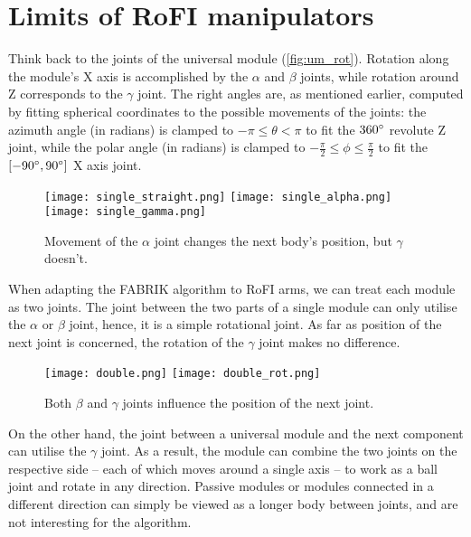 \section{Limits of RoFI manipulators}

Think back to the joints of the universal module (\ref{fig:um_rot}). Rotation along the module's X axis is accomplished by the $\alpha$ and $\beta$ joints, while rotation around Z corresponds to the $\gamma$ joint. The right angles are, as mentioned earlier, computed by fitting spherical coordinates to the possible movements of the joints: the azimuth angle (in radians) is clamped to $-\pi \le \theta < \pi$ to fit the $360\degree$ revolute Z joint, while the polar angle (in radians) is clamped to $-\frac{\pi}{2} \le \phi \le \frac{\pi}{2}$ to fit the $\left[-90\degree, 90\degree\right]$ X axis joint.

\begin{wrapfigure}{r}{0.5\textwidth}
  \centering
  \begin{minipage}{0.5\textwidth}
    \texttt{[image: single\_straight.png]}
    \texttt{[image: single\_alpha.png]}
    \texttt{[image: single\_gamma.png]}
  \end{minipage}
  \caption{Movement of the $\alpha$ joint changes the next body's position, but $\gamma$ doesn't.}
\end{wrapfigure}

When adapting the FABRIK algorithm to RoFI arms, we can treat each module as two joints. The joint between the two parts of a single module can only utilise the $\alpha$ or $\beta$ joint, hence, it is a simple rotational joint. As far as position of the next joint is concerned, the rotation of the $\gamma$ joint makes no difference.

\begin{wrapfigure}{l}{0.4\textwidth}
  \centering
  \begin{minipage}{0.4\textwidth}
    \texttt{[image: double.png]}
    \texttt{[image: double\_rot.png]}
  \end{minipage}
  \caption{Both $\beta$ and $\gamma$ joints influence the position of the next joint.}
\end{wrapfigure}

On the other hand, the joint between a universal module and the next component can utilise the $\gamma$ joint. As a result, the module can combine the two joints on the respective side -- each of which moves around a single axis -- to work as a ball joint and rotate in any direction. Passive modules or modules connected in a different direction can simply be viewed as a longer body between joints, and are not interesting for the algorithm.

